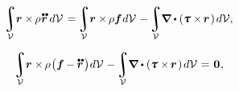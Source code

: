 \begin{otherlanguage}{russian}
\nopagebreak\vspace{-0.2em}\begin{equation*}
\integral\displaylimits_{\mathcal{V}} \hspace{-0.5ex} \currentlocationvector \times \hspace{-0.2ex} \rho \hspace{.1ex} \mathdotdotabove{\currentlocationvector} \hspace{.4ex} d\mathcal{V} \hspace{.22ex}
= \hspace{-0.2ex} \integral\displaylimits_{\mathcal{V}} \hspace{-0.5ex} \currentlocationvector \times \hspace{-0.2ex} \rho \bm{f} \hspace{0.1ex} d\mathcal{V} \hspace{.2ex}
- \hspace{-0.2ex} \integral\displaylimits_{\mathcal{V}} \hspace{-0.5ex} \boldnabla \dotp \left( \cauchystress \times \hspace{-0.24ex} \currentlocationvector \hspace{.2ex} \right) \hspace{-0.1ex} d\mathcal{V} ,
\end{equation*}

\nopagebreak\vspace{-0.2em}\begin{equation*}
\integral\displaylimits_{\mathcal{V}} \hspace{-0.5ex} \currentlocationvector \times \hspace{-0.2ex} \rho \hspace{.15ex} \bigl( \bm{f} \hspace{-0.1ex} - \hspace{-0.1ex} \mathdotdotabove{\currentlocationvector} \hspace{.2ex} \bigr) \hspace{.1ex} d\mathcal{V} \hspace{.12ex}
- \hspace{-0.2ex} \integral\displaylimits_{\mathcal{V}} \hspace{-0.5ex} \boldnabla \dotp \left( \cauchystress \times \hspace{-0.24ex} \currentlocationvector \hspace{.2ex} \right) \hspace{-0.1ex} d\mathcal{V} \hspace{.1ex}
= \hspace{.15ex} \bm{0} \hspace{.1ex} ,
\end{equation*}


\end{otherlanguage}
